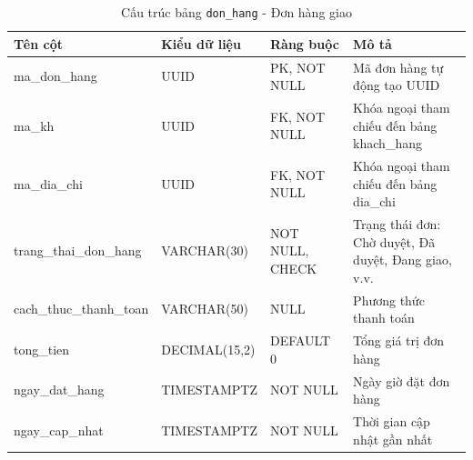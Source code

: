 \begin{table}[H]
  \centering
  \begin{tabularx}{\textwidth}{|l|l|l|>{\raggedright\arraybackslash}X|}
    \hline
    \textbf{Tên cột} & \textbf{Kiểu dữ liệu} & \textbf{Ràng buộc} & \textbf{Mô tả} \\
    \hline
    ma\_don\_hang        & UUID            & PK, NOT NULL    & Mã đơn hàng tự động tạo UUID \\ \hline
    ma\_kh               & UUID            & FK, NOT NULL    & Khóa ngoại tham chiếu đến bảng khach\_hang \\ \hline
    ma\_dia\_chi         & UUID            & FK, NOT NULL    & Khóa ngoại tham chiếu đến bảng dia\_chi \\ \hline
    trang\_thai\_don\_hang & VARCHAR(30)     & NOT NULL, CHECK & Trạng thái đơn: Chờ duyệt, Đã duyệt, Đang giao, v.v. \\ \hline
    cach\_thuc\_thanh\_toan & VARCHAR(50)     & NULL            & Phương thức thanh toán \\ \hline
    tong\_tien           & DECIMAL(15,2)   & DEFAULT 0       & Tổng giá trị đơn hàng \\ \hline
    ngay\_dat\_hang      & TIMESTAMPTZ     & NOT NULL        & Ngày giờ đặt đơn hàng \\ \hline
    ngay\_cap\_nhat      & TIMESTAMPTZ     & NOT NULL        & Thời gian cập nhật gần nhất \\
    \hline
  \end{tabularx}
  \caption{Cấu trúc bảng \texttt{don\_hang} - Đơn hàng giao}
  \label{tab:db-don-hang}
\end{table}

